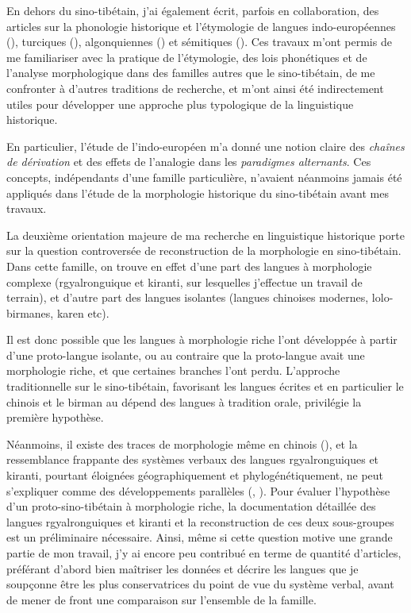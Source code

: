 \documentclass[oldfontcommands,oneside,a4paper,11pt]{article}
\begin{document}
En dehors du sino-tibétain, j'ai également écrit, parfois en collaboration, des articles sur la phonologie historique et l'étymologie de langues indo-européennes (\citealt{jacques13vama}),   turciques (\citealt{antonov12kumush}), algonquiennes (\citealt{jacques13arapaho}) et sémitiques (\citealt{rg-gj12yod}). Ces travaux m'ont permis de me familiariser avec la pratique de l'étymologie, des lois phonétiques et de l'analyse morphologique dans des familles autres que le sino-tibétain, de me confronter à d'autres traditions de recherche, et m'ont ainsi été indirectement utiles pour développer une approche plus typologique de la linguistique historique.  

En particulier, l'étude de l'indo-européen m'a donné une notion claire des \textit{chaînes de dérivation} et des effets de l'analogie dans les \textit{paradigmes alternants}. Ces concepts, indépendants d'une famille particulière, n'avaient néanmoins jamais été appliqués dans l'étude de la morphologie historique du sino-tibétain avant mes travaux.

 La deuxième orientation majeure de ma recherche en linguistique historique porte sur la question controversée de reconstruction de la morphologie en sino-tibétain. Dans cette famille, on trouve en effet d'une part des langues à morphologie complexe (rgyalronguique et kiranti, sur lesquelles j'effectue un travail de terrain), et d'autre part des langues isolantes (langues chinoises modernes, lolo-birmanes, karen etc). 
 
Il est donc possible que les langues à morphologie riche l'ont développée à partir d'une proto-langue isolante, ou au contraire que la proto-langue avait une morphologie riche, et que certaines branches l'ont perdu. L'approche traditionnelle sur le sino-tibétain, favorisant les langues écrites et en particulier le chinois et le birman au dépend des langues à tradition orale, privilégie la première hypothèse. 

Néanmoins, il existe des traces de morphologie même en chinois (\citealt{sagart99roc}), et la ressemblance frappante des systèmes verbaux des langues rgyalronguiques et kiranti, pourtant éloignées géographiquement et phylogénétiquement, ne peut s'expliquer comme des développements parallèles (\citealt{jacques10zos}, \citealt{jacques12agreement}). Pour évaluer l'hypothèse d'un proto-sino-tibétain à morphologie riche, la documentation détaillée des langues rgyalronguiques et kiranti et la reconstruction de ces deux sous-groupes est un préliminaire nécessaire. Ainsi, même si cette question motive une grande partie de mon travail, j'y ai encore peu contribué en terme de quantité d'articles, préférant d'abord bien maîtriser les données et décrire les langues que je soupçonne être les plus conservatrices du point de vue du système verbal, avant de mener de front une comparaison sur l'ensemble de la famille.
   
\end{document}
